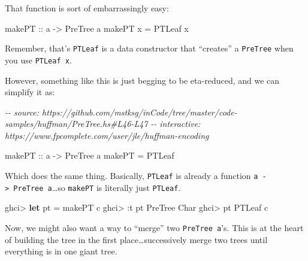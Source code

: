 \documentclass[]{article}
\newenvironment{Shaded}{}{}
\newcommand{\CharTok}[1]{\textcolor[rgb]{0.25,0.44,0.63}{#1}}
\newcommand{\CommentTok}[1]{\textcolor[rgb]{0.38,0.63,0.69}{\textit{#1}}}
\newcommand{\DataTypeTok}[1]{\textcolor[rgb]{0.56,0.13,0.00}{#1}}
\newcommand{\KeywordTok}[1]{\textcolor[rgb]{0.00,0.44,0.13}{\textbf{#1}}}
\newcommand{\NormalTok}[1]{#1}
\newcommand{\OperatorTok}[1]{\textcolor[rgb]{0.40,0.40,0.40}{#1}}
\newcommand{\OtherTok}[1]{\textcolor[rgb]{0.00,0.44,0.13}{#1}}
\begin{document}
That function is sort of embarrassingly easy:

\begin{Shaded}
\begin{Highlighting}[]
\OtherTok{makePT\textquotesingle{} ::}\NormalTok{ a }\OtherTok{{-}\textgreater{}} \DataTypeTok{PreTree}\NormalTok{ a}
\NormalTok{makePT\textquotesingle{} x }\OtherTok{=} \DataTypeTok{PTLeaf}\NormalTok{ x}
\end{Highlighting}
\end{Shaded}

Remember, that's \texttt{PTLeaf} is a data constructor that ``creates'' a
\texttt{PreTree} when you use \texttt{PTLeaf\ x}.

However, something like this is just begging to be eta-reduced, and we can
simplify it as:

\begin{Shaded}
\begin{Highlighting}[]
\CommentTok{{-}{-} source: https://github.com/mstksg/inCode/tree/master/code{-}samples/huffman/PreTree.hs\#L46{-}L47}
\CommentTok{{-}{-} interactive: https://www.fpcomplete.com/user/jle/huffman{-}encoding}

\OtherTok{makePT ::}\NormalTok{ a }\OtherTok{{-}\textgreater{}} \DataTypeTok{PreTree}\NormalTok{ a}
\NormalTok{makePT }\OtherTok{=} \DataTypeTok{PTLeaf}
\end{Highlighting}
\end{Shaded}

Which does the same thing. Basically, \texttt{PTLeaf} is already a function
\texttt{a\ -\textgreater{}\ PreTree\ a}\ldots so \texttt{makePT} is literally
just \texttt{PTLeaf}.

\begin{Shaded}
\begin{Highlighting}[]
\NormalTok{ghci}\OperatorTok{\textgreater{}} \KeywordTok{let}\NormalTok{ pt }\OtherTok{=}\NormalTok{ makePT }\CharTok{\textquotesingle{}c\textquotesingle{}}
\NormalTok{ghci}\OperatorTok{\textgreater{}} \OperatorTok{:}\NormalTok{t pt}
\DataTypeTok{PreTree} \DataTypeTok{Char}
\NormalTok{ghci}\OperatorTok{\textgreater{}}\NormalTok{ pt}
\DataTypeTok{PTLeaf} \CharTok{\textquotesingle{}c\textquotesingle{}}
\end{Highlighting}
\end{Shaded}

Now, we might also want a way to ``merge'' two \texttt{PreTree\ a}'s. This is at
the heart of building the tree in the first place\ldots successively merge two
trees until everything is in one giant tree.
\end{document}
